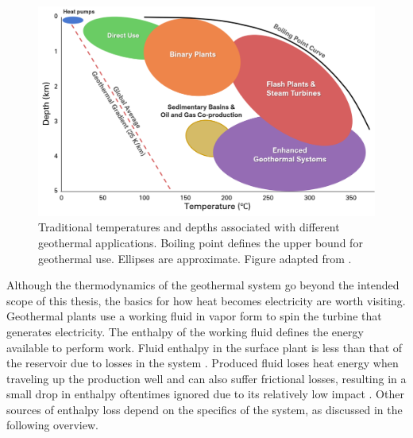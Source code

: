 \begin{figure}
\centering
\includegraphics[width=\textwidth]{templates/images/Figure-Geothermal_Use_Moore2013.png}
\caption[Geothermal applications by temperature and depth]{Traditional temperatures and depths associated with different geothermal applications. Boiling point defines the upper bound for geothermal use. Ellipses are approximate. Figure adapted from \protect\citep{moore_more_2013}.}
\label{fig:geotherm_apps}
\end{figure}

Although the thermodynamics of the geothermal system go beyond the intended scope of this thesis, the basics for how heat becomes electricity are worth visiting. Geothermal plants use a working fluid in vapor form to spin the turbine that generates electricity. The enthalpy of the working fluid defines the energy available to perform work. Fluid enthalpy in the surface plant is less than that of the reservoir due to losses in the system \citep[p.\ 204]{glassley_geothermal_2015}. Produced fluid loses heat energy when traveling up the production well and can also suffer frictional losses, resulting in a small drop in enthalpy oftentimes ignored due to its relatively low impact \citep[p.\ 204]{glassley_geothermal_2015}. Other sources of enthalpy loss depend on the specifics of the system, as discussed in the following overview.

